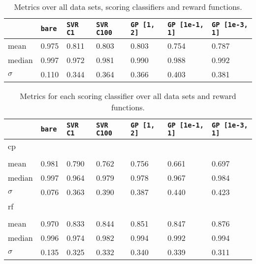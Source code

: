 
\begin{table}
\begin{center}
  {\scriptsize
  \begin{tabu}{l|l|l|l|l|l|l}

&\texttt{bare} &\texttt{SVR C1} &\texttt{SVR C100} &\texttt{GP [1, 2]} &\texttt{GP [1e-1, 1]} &\texttt{GP [1e-3, 1]} \\\hline
mean &0.975 &0.811 &0.803 &0.803 &0.754 &0.787 \\
median &0.997 &0.972 &0.981 &0.990 &0.988 &0.992 \\
$\sigma$ &0.110 &0.344 &0.364 &0.366 &0.403 &0.381 \\

  \end{tabu} }
  \caption{Metrics over all data sets,
        scoring classifiers and reward functions. }
  \label{tab:metrics_overall}
\end{center}
\end{table}

\begin{table}
\begin{center}
  {\scriptsize
  \begin{tabu}{l|l|l|l|l|l|l}

&\texttt{bare} &\texttt{SVR C1} &\texttt{SVR C100} &\texttt{GP [1, 2]} &\texttt{GP [1e-1, 1]} &\texttt{GP [1e-3, 1]} \\
\hline
cp &&&&&& \\ &&&&&&\\
mean &0.981 &0.790 &0.762 &0.756 &0.661 &0.697 \\
median &0.997 &0.964 &0.979 &0.978 &0.967 &0.984 \\
$\sigma$ &0.076 &0.363 &0.390 &0.387 &0.440 &0.423 \\
\hline
rf &&&&&& \\ &&&&&&\\
mean &0.970 &0.833 &0.844 &0.851 &0.847 &0.876 \\
median &0.996 &0.974 &0.982 &0.994 &0.992 &0.994 \\
$\sigma$ &0.135 &0.325 &0.332 &0.340 &0.339 &0.311 \\

  \end{tabu} }
  \caption{Metrics for each scoring classifier
        over all data sets and reward functions. }
  \label{tab:metrics_scorer}
\end{center}
\end{table}

